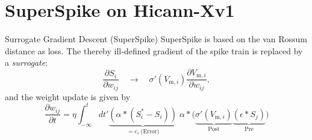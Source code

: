 \documentclass[12pt, aspectratio=169]{beamer}
\begin{document}
\section{SuperSpike on Hicann-Xv1}
\begin{frame}{Surrogate Gradient Descent (SuperSpike)}
SuperSpike is based on the van Rossum distance as loss. The thereby ill-defined gradient of the spike train is replaced by a \emph{surrogate}:\\
\begin{equation*}
\frac{\partial S_i}{\partial w_{ij}} \quad \rightarrow \quad \sigma'(V_{\text{m},i})\frac{\partial V_{\text{m},i}}{\partial w_{ij}},
\end{equation*}
and the weight update is given by
\begin{equation*}
\frac{\partial w_{ij}}{\partial t} = \eta \int_{-\infty}^{t} dt'
\underbrace{\left(\alpha \ast (S^*_i - S_i)\right)}_{= e_i \; \text{(Error)}} 
\; \alpha \ast 
\Big(\underbrace{\sigma'(V_{\text{m},i})}_{\text{Post}} 
\underbrace{\left(\epsilon \ast S_j\right)}_{\text{Pre}}\Big)
\label{superspikeweightupdateeq}
\end{equation*}

\end{frame}
\end{document}
